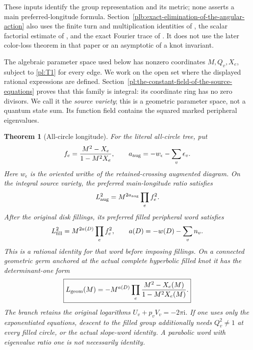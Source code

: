 \documentclass[11pt]{article}
\numberwithin{equation}{section}
\newtheorem{theorem}{Theorem}[section]
\theoremstyle{definition}\newtheorem{definition}[theorem]{Definition}
\theoremstyle{remark}\newtheorem{remark}[theorem]{Remark}
\newcommand{\ii}{\mathrm i}
\begin{document}
These inputs identify the group representation and its metric; none asserts a main preferred-longitude formula. Section~\ref{plb:exact-elimination-of-the-angular-action} also uses the finite turn and multiplication identities of \cite[Proposition 3.2 and Theorem 3.3]{Newton}, the scalar factorial estimate of \cite[Lemma 6.2]{Newton}, and the exact Fourier trace of \cite[Lemma 6.1]{SourceBounds}. It does not use the later color-loss theorem in that paper or an asymptotic of a knot invariant.

The algebraic parameter space used below has nonzero coordinates
$M,Q_v,X_e$, subject to \eqref{pl:T1} for every edge. We work on
the open set where the displayed rational expressions are defined.
Section~\ref{pl:the-constant-field-of-the-source-equations} proves
that this family is integral: its coordinate ring has no zero divisors.
We call it the \emph{source variety}; this is a geometric parameter
space, not a quantum state sum. Its function field contains the
squared marked peripheral eigenvalues.

\begin{theorem}[All-circle longitude]\label{pl:all-circle}
For the literal all-circle tree, put
\begin{equation}\label{pl:f}
 f_e=\frac{M^2-X_e}{1-M^2X_e},\qquad
 a_{\rm aug}=-w_\epsilon-\sum_v\epsilon_v.
\end{equation}
Here $w_\epsilon$ is the oriented writhe of the retained-crossing augmented diagram. On the integral source variety, the preferred main-longitude ratio satisfies
\begin{equation}\label{pl:T4} L_{\rm aug}^2=M^{2a_{\rm aug}}\prod_e f_e^2.\end{equation}
After the original disk fillings, its preferred filled peripheral word satisfies
\begin{equation}\label{pl:T6} L_{\rm fill}^2=M^{2a(D)}\prod_e f_e^2,
\qquad a(D)=-w(D)-\sum_v n_v.\end{equation}
This is a rational identity for that word before imposing fillings. On a connected geometric germ anchored at the actual complete hyperbolic filled knot it has the determinant-one form
\begin{equation}\label{pl:T7}
 \boxed{L_{\rm geom}(M)=-M^{a(D)}\prod_e\frac{M^2-X_e(M)}{1-M^2X_e(M)}.}
\end{equation}
The branch retains the original logarithms $U_v+p_vV_v=-2\pi\ii$. If one uses only the exponentiated equations, descent to the filled group additionally needs $Q_v^2\ne1$ at every filled circle, or the actual slope-word identity. A parabolic word with eigenvalue ratio one is not necessarily identity.
\end{theorem}
\end{document}
